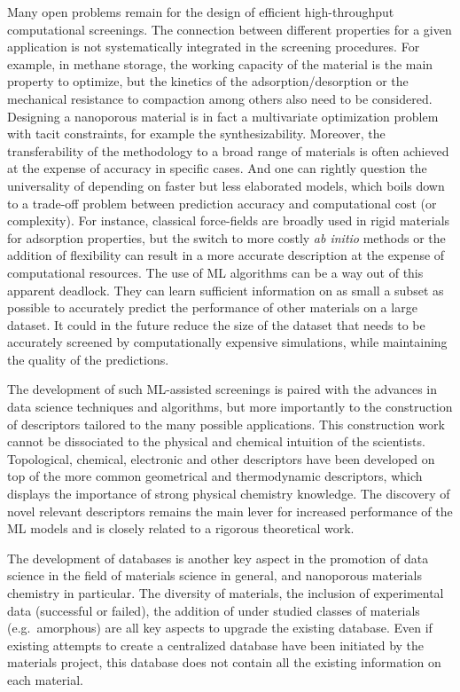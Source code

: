 \documentclass[main.tex]{subfiles}
\begin{document}
{Many open problems remain for the design of efficient high-throughput computational screenings}. The connection between different properties for a given application is not systematically integrated in the screening procedures. For example, in methane storage, the working capacity of the material is the main property to optimize, but the kinetics of the adsorption/desorption or the mechanical resistance to compaction among others also need to be considered. Designing a nanoporous material is in fact a multivariate optimization problem with tacit constrain{t}s, for example the {synthesizability}. Moreover, {the transferability of the methodology to a broad range of materials is often achieved at the expense of accuracy in specific cases.} {And one can rightly question the universality of depending on faster but less elaborated models}, which boils down to a trade-off problem between prediction accuracy and computational cost (or complexity). For instance, classical force-fields are broadly used in rigid materials for adsorption properties, but the switch to more costly \emph{ab initio} methods or the addition of flexibility can result in a more accurate description at the expense of computational resources. The use of ML algorithms can be a way out of this apparent deadlock. They can learn sufficient information on as small a subset as possible to accurately predict the performance of other materials on a large dataset. It could in the future reduce the size of the dataset that needs to be accurately screened by computationally expensive simulations, while maintaining the quality of the predictions.

The development of such ML-assisted screenings is paired with the advances in data science techniques and algorithms, but more importantly to the construction of descriptors tailored to the many possible applications. This construction work cannot be dissociated to the physical and chemical intuition of the scientists. Topological, chemical, electronic and other descriptors have been developed on top of the more common geometrical and thermodynamic descriptors, which displays the importance of strong physical chemistry knowledge. The discovery of novel relevant descriptors remains the main lever for increased performance of the ML models and is closely related to a rigorous theoretical work.


The development of databases is another key aspect in the promotion of data science in the field of materials science in general, and nanoporous materials chemistry in particular. The diversity of materials, the inclusion of experimental data (successful or failed), the addition of under studied classes of materials (e.g.\ amorphous) are all key aspects to upgrade the existing database. Even if existing attempts to create a centralized database have been initiated by the materials project,\cite{MaterialsProject} this database does not contain all the existing information on each material.
\end{document}
